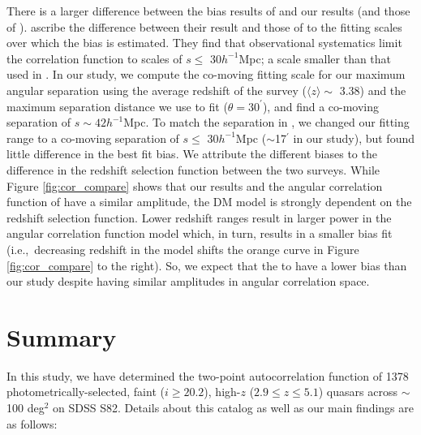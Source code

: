 \documentclass[apj, numberedappendix]{emulateapj}
\begin{document}
There is a larger difference between the bias results of \citet{Eft2015} and our results (and those of \citealt{Shen2007}). \citet{Eft2015} ascribe the difference between their result and those of \citet{Shen2007} to the fitting scales over which the bias is estimated. They find that observational systematics limit the correlation function to scales of $s \leq$ 30$h^{-1}$Mpc; a scale smaller than that used in \citet{Shen2007}. In our study, we compute the co-moving fitting scale for our maximum angular separation using the average redshift of the survey ($\langle z\rangle \sim$ 3.38) and the maximum separation distance we use to fit ($\theta = 30^\prime$), and find a co-moving separation of $s \sim 42h^{-1}$Mpc. To match the separation in \citet{Eft2015}, we changed our fitting range to a co-moving separation of $s \leq$ 30$h^{-1}$Mpc ($\sim$17$^\prime$ in our study), but found little difference in the best fit bias. We attribute the different biases to the difference in the redshift selection function between the two surveys. While Figure \ref{fig:cor_compare} shows that our results and the angular correlation function of \citet{Eft2015} have a similar amplitude, the DM model is strongly dependent on the redshift selection function. Lower redshift ranges result in larger power in the angular correlation function model which, in turn, results in a smaller bias fit (i.e.,\ decreasing redshift in the model shifts the orange curve in Figure \ref{fig:cor_compare} to the right). So, we expect that the \citet{Eft2015} to have a lower bias than our study despite having similar amplitudes in angular correlation space. 


\section{Summary}\label{sec:6}
In this study, we have determined the two-point autocorrelation function of 1378 photometrically-selected, faint ($i \geq 20.2$), high-$z$ ($2.9 \leq z \leq 5.1$) quasars across $\sim$100 deg$^2$ on SDSS S82. Details about this catalog as well as our main findings are as follows:
\end{document}

